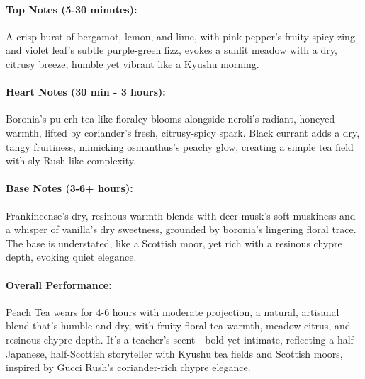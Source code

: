 \documentclass{article}
\begin{document}
\paragraph{\textcolor{colaRed}{\textbf{Top Notes (5-30 minutes):}}}
A crisp burst of bergamot, lemon, and lime, with pink pepper’s fruity-spicy zing and violet leaf’s subtle purple-green fizz, evokes a sunlit meadow with a dry, citrusy breeze, humble yet vibrant like a Kyushu morning.

\paragraph{\textcolor{colaBrown}{\textbf{Heart Notes (30 min - 3 hours):}}}
Boronia’s pu-erh tea-like floralcy blooms alongside neroli’s radiant, honeyed warmth, lifted by coriander’s fresh, citrusy-spicy spark. Black currant adds a dry, tangy fruitiness, mimicking osmanthus’s peachy glow, creating a simple tea field with sly Rush-like complexity.

\paragraph{\textcolor{colaDark}{\textbf{Base Notes (3-6+ hours):}}}
Frankincense’s dry, resinous warmth blends with deer musk’s soft muskiness and a whisper of vanilla’s dry sweetness, grounded by boronia’s lingering floral trace. The base is understated, like a Scottish moor, yet rich with a resinous chypre depth, evoking quiet elegance.

\paragraph{\textcolor{violetPurple}{\textbf{Overall Performance:}}}
Peach Tea wears for 4-6 hours with moderate projection, a natural, artisanal blend that’s humble and dry, with fruity-floral tea warmth, meadow citrus, and resinous chypre depth. It’s a teacher’s scent—bold yet intimate, reflecting a half-Japanese, half-Scottish storyteller with Kyushu tea fields and Scottish moors, inspired by Gucci Rush’s coriander-rich chypre elegance.
\end{document}
